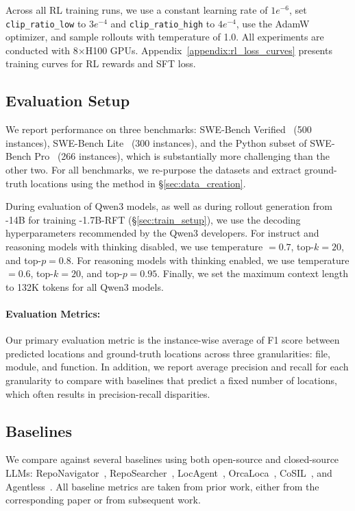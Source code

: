Across all \methodname RL training runs, we use a constant learning rate of $1e^{-6}$, set \texttt{clip\_ratio\_low} to $3e^{-4}$ and \texttt{clip\_ratio\_high} to $4e^{-4}$, use the AdamW optimizer, and sample rollouts with temperature of 1.0. All experiments are conducted with 8$\times$H100 GPUs. Appendix~\ref{appendix:rl_loss_curves} presents training curves for RL rewards and SFT loss.

\subsection{Evaluation Setup}\label{sec:eval_benchmarks}

We report performance on three benchmarks: SWE-Bench Verified~\citep{chowdhury2024swebenchverified} (500 instances), SWE-Bench Lite~\citep{jimenez2024swebenchlanguagemodelsresolve} (300 instances), and the Python subset of SWE-Bench Pro~\citep{deng2025swebenchproaiagents} (266 instances), which is substantially more challenging than the other two. For all benchmarks, we re-purpose the datasets and extract ground-truth locations using the method in \S\ref{sec:data_creation}.

During evaluation of Qwen3 models, as well as during rollout generation from \methodname-14B for training \methodname-1.7B-RFT (\S\ref{sec:train_setup}), we use the decoding hyperparameters recommended by the Qwen3 developers. For instruct and reasoning models with thinking disabled, we use temperature $=0.7$, top-$k=20$, and top-$p=0.8$. For reasoning models with thinking enabled, we use temperature $=0.6$, top-$k=20$, and top-$p=0.95$. Finally, we set the maximum context length to 132K tokens for all Qwen3 models.

\paragraph{Evaluation Metrics:} Our primary evaluation metric is the instance-wise average of F1 score between predicted locations and ground-truth locations across three granularities: file, module, and function. In addition, we report average precision and recall for each granularity to compare with baselines that predict a fixed number of locations, which often results in precision-recall disparities.
\subsection{Baselines}\label{sec:baselines}
We compare \methodname against several baselines using both open-source and closed-source LLMs: RepoNavigator~\citep{zhang2025one}, RepoSearcher~\citep{ma2025toolintegratedreinforcementlearningrepo}, LocAgent~\citep{chen-etal-2025-locagent}, OrcaLoca~\citep{yu2025orcalocallmagentframework}, CoSIL~\citep{jiang2025issuelocalizationllmdriveniterative}, and Agentless~\citep{xia2024agentless}. All baseline metrics are taken from prior work, either from the corresponding paper or from subsequent work.

